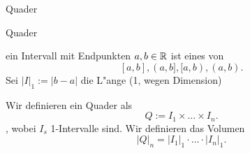 \documentclass[class=article, crop=false]{standalone}
\begin{document}
\begin{zettel}{Quader}
\begin{flashcard}[q5rw101e]{Quader}
	\begin{definition}
		ein Intervall mit Endpunkten $a,b \in  \mathbb{R} $ ist eines von
		\[
			[a,b], (a,b], [a,b), (a,b)
		.\]
		Sei $|I |_1 := |b-a|$ die L"ange (1, wegen Dimension)

		Wir definieren ein Quader als
		\[
			Q := I_1 \times \dots \times I_n
		.\], wobei $I_s$ 1-Intervalle sind.
		Wir definieren das Volumen
		\[
			|Q |_n = |I_1 |_1 \cdot \dots \cdot |I_n |_1
		.\]
	\end{definition}
\end{flashcard}
\end{zettel}
\end{document}
